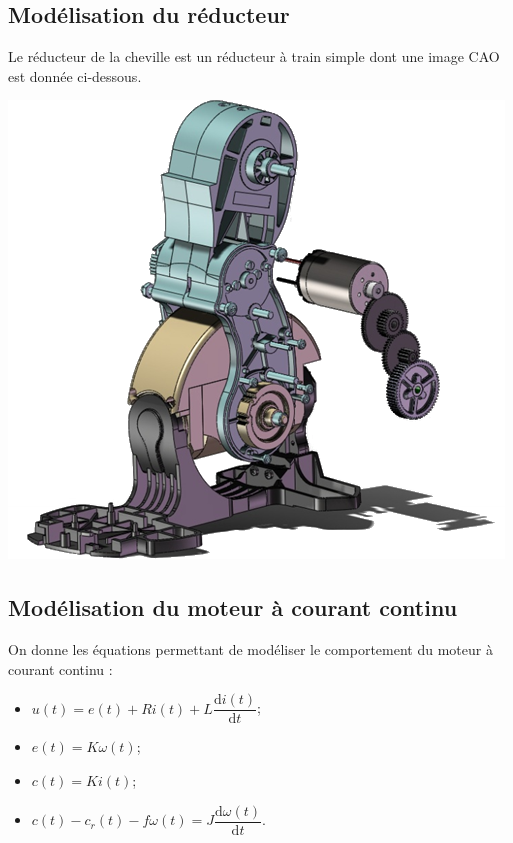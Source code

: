 \documentclass[10pt,fleqn]{article} %
\begin{document}
\begin{multicols}{2}
\subsection*{Modélisation du réducteur}
Le réducteur de la cheville est un réducteur à train simple dont une image CAO est donnée ci-dessous.
\begin{center}
\includegraphics[width=.7\linewidth]{images/fig_03}
\end{center}

%
%

\subsection*{Modélisation du moteur à courant continu}
On donne les équations permettant de modéliser le comportement du moteur à courant continu :
\begin{itemize}
\item $u(t) = e(t)+ Ri(t) +L \dfrac{\text{d}i(t)}{\text{d} t}$;
\item $e(t)=K\omega(t)$;
\item $c(t)=Ki(t)$;
\item $c(t)-c_r(t) - f\omega(t)=J\dfrac{\text{d}\omega(t)}{\text{d} t}$.
\end{itemize}


\end{multicols}
\end{document}
